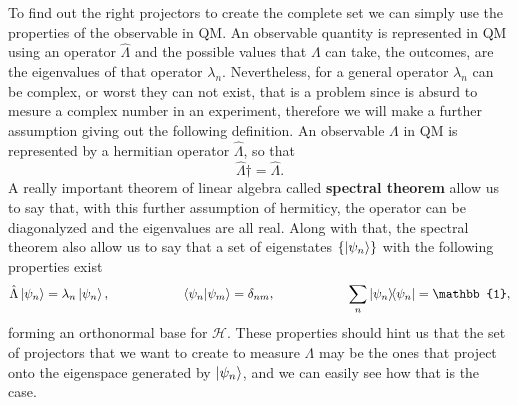 To find out the right projectors to create the complete set we can simply use the properties of the observable in QM. An observable quantity is represented in QM using an operator $\hat{\Lambda}$ and the possible values that $\Lambda$ can take, the outcomes, are the eigenvalues of that operator $\lambda_n$. Nevertheless, for a general operator $\lambda_n$ can be complex, or worst they can not exist, that is a problem since is absurd to mesure a complex number in an experiment, therefore we will make a further assumption giving out the following definition.
{
    An observable $\Lambda$ in QM is represented by a hermitian operator $\hat{\Lambda}$, so that
    \begin{equation}
        \hat{\Lambda}\dagger = \hat{\Lambda}.
    \end{equation}
}
\noindent
A really important theorem of linear algebra called \textbf{spectral theorem} allow us to say that, with this further assumption of hermiticy, the operator can be diagonalyzed and the eigenvalues are all real. Along with that, the spectral theorem also allow us to say that a set of eigenstates $\{\ket{\psi_n}\}$ with the following properties exist
\begin{equation}
    \label{eq:BaseDef}
    \hat{\Lambda}\ket{\psi_n} = \lambda_n\ket{\psi_n}, \hspace{2cm} \braket{\psi_n}{\psi_m} = \delta_{nm}, \hspace{2cm} \sum_n \ketbra{\psi_n}{\psi_n} = \mathbb{1},
\end{equation}
forming an orthonormal base for $\mathcal{H}$. These properties should hint us that the set of projectors that we want to create to measure $\Lambda$ may be the ones that project onto the eigenspace generated by $\ket{\psi_n}$, and we can easily see how that is the case. 

